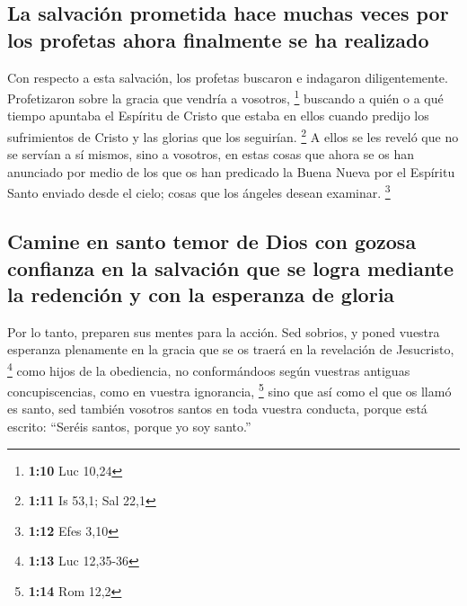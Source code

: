 \begin{paracol}{2}
\hypertarget{la-salvaciuxf3n-prometida-hace-muchas-veces-por-los-profetas-ahora-finalmente-se-ha-realizado}{%
\subsection{La salvación prometida hace muchas veces por los profetas
ahora finalmente se ha
realizado}\label{la-salvaciuxf3n-prometida-hace-muchas-veces-por-los-profetas-ahora-finalmente-se-ha-realizado}}

 Con respecto a esta salvación, los profetas buscaron e
indagaron diligentemente. Profetizaron sobre la gracia que vendría a
vosotros, \footnote{\textbf{1:10} Luc 10,24}  buscando a
quién o a qué tiempo apuntaba el Espíritu de Cristo que estaba en ellos
cuando predijo los sufrimientos de Cristo y las glorias que los
seguirían. \footnote{\textbf{1:11} Is 53,1; Sal 22,1}  A
ellos se les reveló que no se servían a sí mismos, sino a vosotros, en
estas cosas que ahora se os han anunciado por medio de los que os han
predicado la Buena Nueva por el Espíritu Santo enviado desde el cielo;
cosas que los ángeles desean examinar. \footnote{\textbf{1:12} Efes 3,10}

\hypertarget{camine-en-santo-temor-de-dios-con-gozosa-confianza-en-la-salvaciuxf3n-que-se-logra-mediante-la-redenciuxf3n-y-con-la-esperanza-de-gloria}{%
\subsection{Camine en santo temor de Dios con gozosa confianza en la
salvación que se logra mediante la redención y con la esperanza de
gloria}\label{camine-en-santo-temor-de-dios-con-gozosa-confianza-en-la-salvaciuxf3n-que-se-logra-mediante-la-redenciuxf3n-y-con-la-esperanza-de-gloria}}

 Por lo tanto, preparen sus mentes para la acción. Sed
sobrios, y poned vuestra esperanza plenamente en la gracia que se os
traerá en la revelación de Jesucristo, \footnote{\textbf{1:13} Luc
  12,35-36}  como hijos de la obediencia, no
conformándoos según vuestras antiguas concupiscencias, como en vuestra
ignorancia, \footnote{\textbf{1:14} Rom 12,2}  sino que
así como el que os llamó es santo, sed también vosotros santos en toda
vuestra conducta,  porque está escrito: ``Seréis santos,
porque yo soy santo.''


\end{paracol}
